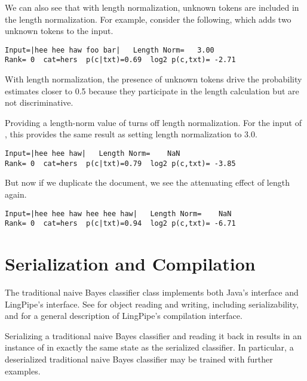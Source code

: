 We can also see that with length normalization, unknown tokens
are included in the length normalization.  For example, consider
the following, which adds two unknown tokens to the input.
%
\begin{verbatim}
Input=|hee hee haw foo bar|   Length Norm=   3.00
Rank= 0  cat=hers  p(c|txt)=0.69  log2 p(c,txt)= -2.71
\end{verbatim}
%
With length normalization, the presence of unknown tokens drive
the probability estimates closer to 0.5 because they participate
in the length calculation but are not discriminative.  

Providing a length-norm value of  turns off
length normalization.  For the input of ,
this provides the same result as setting length normalization to
3.0.
%
\begin{verbatim}
Input=|hee hee haw|   Length Norm=    NaN
Rank= 0  cat=hers  p(c|txt)=0.79  log2 p(c,txt)= -3.85
\end{verbatim}
%
But now if we duplicate the document, we see the attenuating
effect of length again.
%
\begin{verbatim}
Input=|hee hee haw hee hee haw|   Length Norm=    NaN
Rank= 0  cat=hers  p(c|txt)=0.94  log2 p(c,txt)= -6.71
\end{verbatim}



\section{Serialization and Compilation}

The traditional naive Bayes classifier class implements both Java's
 interface and LingPipe's 
interface.  See  for object reading and
writing, including serializability, and  for a
general description of LingPipe's compilation interface.

Serializing a traditional naive Bayes classifier and reading it
back in results in an instance of  in
exactly the same state as the serialized classifier.  In particular,
a deserialized traditional naive Bayes classifier may be trained
with further examples.  

